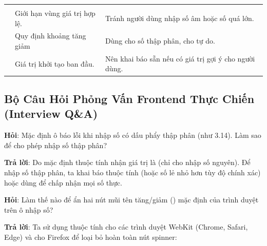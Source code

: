 \begin{prettyTableBox}
\begin{tabularx}{\linewidth}{K{2.8cm}Z Z}
 &  &  \\
 & Giới hạn vùng giá trị hợp lệ. & Tránh người dùng nhập số âm hoặc số quá lớn. \\
 & Quy định khoảng tăng giảm & Dùng  cho số thập phân,  cho tự do. \\
 & Giá trị khởi tạo ban đầu. & Nên khai báo sẵn nếu có giá trị gợi ý cho người dùng. \\
\end{tabularx}
\end{prettyTableBox}

\subsection{Bộ Câu Hỏi Phỏng Vấn Frontend Thực Chiến (Interview Q\&A)}

\begin{noteBox}[Câu Hỏi Phỏng Vấn 1: Nhập Số Thập Phân Trong input type="number"]
\textbf{Hỏi}: Mặc định ô  báo lỗi khi nhập số có dấu phẩy thập phân (như 3.14). Làm sao để cho phép nhập số thập phân?
\par\vspace{3pt}
\textbf{Trả lời}: Do mặc định thuộc tính  nhận giá trị là  (chỉ cho nhập số nguyên). Để nhập số thập phân, ta khai báo thuộc tính  (hoặc số lẻ nhỏ hơn tùy độ chính xác) hoặc dùng  để chấp nhận mọi số thực.
\end{noteBox}

\begin{noteBox}
\textbf{Hỏi}: Làm thế nào để ẩn hai nút mũi tên tăng/giảm () mặc định của trình duyệt trên ô nhập số?
\par\vspace{3pt}
\textbf{Trả lời}: Ta sử dụng thuộc tính  cho các trình duyệt WebKit (Chrome, Safari, Edge) và  cho Firefox để loại bỏ hoàn toàn nút spinner:
\end{noteBox}

